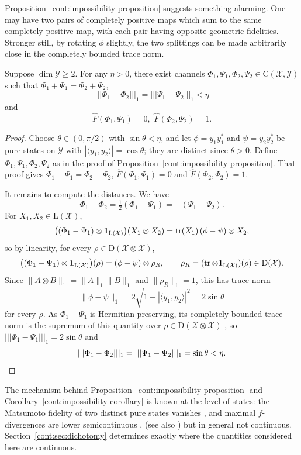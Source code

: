 Proposition~\ref{cont:impossibility proposition} suggests something alarming. One may have two pairs of completely positive maps which sum to the same completely positive map, with each pair having opposite geometric fidelities. Stronger still, by rotating $\phi$ slightly, the two splittings can be made arbitrarily close in the completely bounded trace norm. 
\begin{corollary}\label{cont:impossibility corollary}
    Suppose $\dim\mathcal{Y}\geq 2$. For any $\eta>0$, there exist channels $\Phi_1,\Psi_1,\Phi_2,\Psi_2\in\mathrm{C}(\mathcal{X},\mathcal{Y})$ such that $\Phi_1+\Psi_1=\Phi_2+\Psi_2$, \[|||\Phi_1-\Phi_2|||_1 =|||\Psi_1-\Psi_2|||_1<\eta\] and 
    \[\widehat{F}(\Phi_1,\Psi_1)=0, \,\, \widehat{F}(\Phi_2,\Psi_2)=1. \]
\end{corollary}
\begin{proof}
Choose $\theta\in(0,\pi/2)$ with $\sin\theta<\eta$, and let $\phi=y_1y_1^*$ and $\psi=y_2y_2^*$ be pure states on $\mathcal{Y}$ with $|\langle y_1,y_2\rangle|=\cos\theta$; they are distinct since $\theta>0$. Define $\Phi_1,\Psi_1,\Phi_2,\Psi_2$ as in the proof of Proposition~\ref{cont:impossibility proposition}. That proof gives $\Phi_1+\Psi_1=\Phi_2+\Psi_2$, $\widehat{F}(\Phi_1,\Psi_1)=0$ and $\widehat{F}(\Phi_2,\Psi_2)=1$.
 
It remains to compute the distances. We have
\[
\Phi_1-\Phi_2=\tfrac12(\Phi_1-\Psi_1)=-(\Psi_1-\Psi_2).
\]
For $X_1,X_2\in\mathrm{L}(\mathcal{X})$,
\[
\big((\Phi_1-\Psi_1)\otimes\mathbf{1}_{\mathrm{L}(\mathcal{X})}\big)(X_1\otimes X_2)=\operatorname{tr}(X_1)\,(\phi-\psi)\otimes X_2,
\]
so by linearity, for every $\rho\in\mathrm{D}(\mathcal{X}\otimes\mathcal{X})$,
\[
\big((\Phi_1-\Psi_1)\otimes\mathbf{1}_{\mathrm{L}(\mathcal{X})}\big)(\rho)=(\phi-\psi)\otimes\rho_R,\qquad \rho_R=(\operatorname{tr}\otimes\mathbf{1}_{\mathrm{L}(\mathcal{X})})(\rho)\in\mathrm{D}(\mathcal{X}).
\]
Since $\|A\otimes B\|_1=\|A\|_1\|B\|_1$ and $\|\rho_R\|_1=1$, this has trace norm
\[
\|\phi-\psi\|_1=2\sqrt{1-|\langle y_1,y_2\rangle|^2}=2\sin\theta
\]
for every $\rho$. As $\Phi_1-\Psi_1$ is Hermitian-preserving, its completely bounded trace norm is the supremum of this quantity over $\rho\in\mathrm{D}(\mathcal{X}\otimes\mathcal{X})$ \cite[Section~3.3]{watrous2018theory}, so $|||\Phi_1-\Psi_1|||_1=2\sin\theta$ and
\[
|||\Phi_1-\Phi_2|||_1=|||\Psi_1-\Psi_2|||_1=\sin\theta<\eta. \qedhere
\]
\end{proof}
 
\begin{remark}
The mechanism behind Proposition~\ref{cont:impossibility proposition} and Corollary~\ref{cont:impossibility corollary} is known at the level of states: the Matsumoto fidelity of two distinct pure states vanishes \cite{cree2020fidelity}, and maximal $f$-divergences are lower semicontinuous \cite[Section~5]{Hiai2019maximal}, \cite[Theorem~A.4]{MosonyiHiai2024} (see also \cite{Matsumoto2018newf}) but in general not continuous. Section~\ref{cont:sec:dichotomy} determines exactly where the quantities considered here are continuous.
\end{remark}
 
